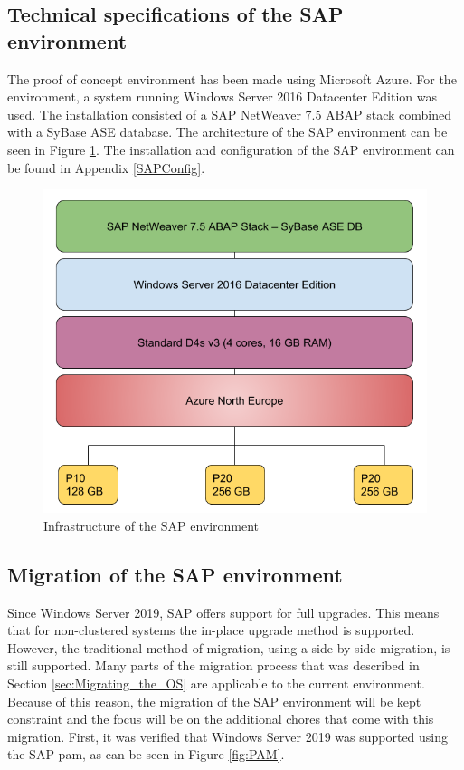 \subsection{Technical specifications of the SAP environment}
The proof of concept environment has been made using Microsoft Azure. 
For the environment, a system running Windows Server 2016 Datacenter Edition was used.
The installation consisted of a SAP NetWeaver 7.5 ABAP stack combined with a SyBase ASE database. 
The architecture of the SAP environment can be seen in Figure \ref{fig:SAPInfra}.
The installation and configuration of the SAP environment can be found in Appendix \ref{SAPConfig}.

\begin{figure}[h]
	\captionsetup{width=0.8\linewidth}
	\includegraphics[width=0.9\linewidth]{img/Methodologie/SAP_PO.png}
	\centering
	\caption[SAP Infrastructure]{Infrastructure of the SAP environment}
	\label{fig:SAPInfra}	
\end{figure}

\subsection{Migration of the SAP environment}
Since Windows Server 2019, SAP offers support for full upgrades. 
This means that for non-clustered systems the in-place upgrade method is supported.
However, the traditional method of migration, using a side-by-side migration, is still supported. 
Many parts of the migration process that was described in Section \ref{sec:Migrating_the_OS} are applicable to the current environment. 
Because of this reason, the migration of the SAP environment will be kept constraint and the focus will be on the additional chores that come with this migration.
First, it was verified that Windows Server 2019 was supported using the SAP \acrfull{pam}, as can be seen in Figure \ref{fig:PAM}.


